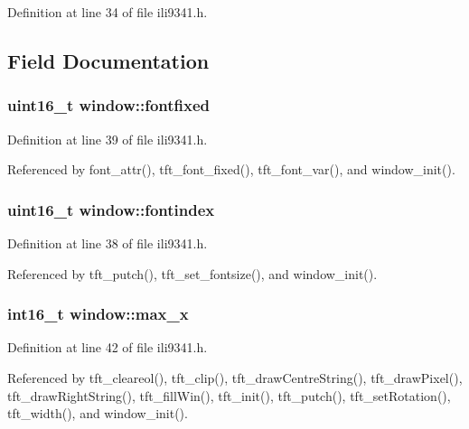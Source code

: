 Definition at line 34 of file ili9341.\-h.



\subsection{Field Documentation}
\hypertarget{structwindow_a5afd09eaf1e9c22fa611f0f529177ac9}{
\subsubsection[{fontfixed}]{\setlength{\rightskip}{0pt plus 5cm}uint16\-\_\-t window\-::fontfixed}}\label{structwindow_a5afd09eaf1e9c22fa611f0f529177ac9}


Definition at line 39 of file ili9341.\-h.



Referenced by font\-\_\-attr(), tft\-\_\-font\-\_\-fixed(), tft\-\_\-font\-\_\-var(), and window\-\_\-init().

\hypertarget{structwindow_a00da6dceaca10739712164daaa08a2dd}{
\subsubsection[{fontindex}]{\setlength{\rightskip}{0pt plus 5cm}uint16\-\_\-t window\-::fontindex}}\label{structwindow_a00da6dceaca10739712164daaa08a2dd}


Definition at line 38 of file ili9341.\-h.



Referenced by tft\-\_\-putch(), tft\-\_\-set\-\_\-fontsize(), and window\-\_\-init().

\hypertarget{structwindow_affe3812cbf97934375f43e82fdd76166}{
\subsubsection[{max\-\_\-x}]{\setlength{\rightskip}{0pt plus 5cm}int16\-\_\-t window\-::max\-\_\-x}}\label{structwindow_affe3812cbf97934375f43e82fdd76166}


Definition at line 42 of file ili9341.\-h.



Referenced by tft\-\_\-cleareol(), tft\-\_\-clip(), tft\-\_\-draw\-Centre\-String(), tft\-\_\-draw\-Pixel(), tft\-\_\-draw\-Right\-String(), tft\-\_\-fill\-Win(), tft\-\_\-init(), tft\-\_\-putch(), tft\-\_\-set\-Rotation(), tft\-\_\-width(), and window\-\_\-init().

